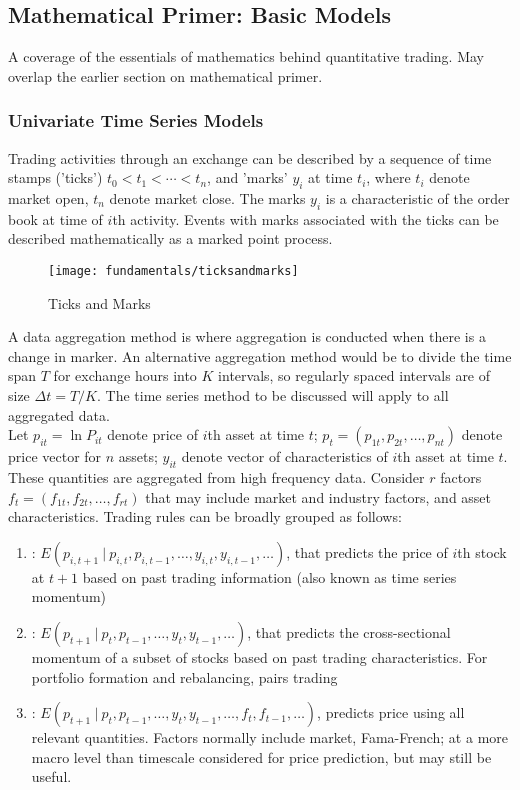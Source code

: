 \subsection{Mathematical Primer: Basic Models}

A coverage of the essentials of mathematics behind quantitative trading. May overlap the earlier section on mathematical primer.

\subsubsection{Univariate Time Series Models}

Trading activities through an exchange can be described by a sequence of time stamps ('ticks') $t_0 < t_1 < \cdots < t_n$, and 'marks' $y_i$ at time $t_i$, where $t_i$ denote market open, $t_n$ denote market close. The marks $y_i$ is a characteristic of the order book at time of $i$th activity. Events with marks associated with the ticks can be described mathematically as a marked point process.
\begin{figure}[H]
\centering
\texttt{[image: fundamentals/ticksandmarks]}
\caption{Ticks and Marks}
\end{figure}

A data aggregation method is where aggregation is conducted when there is a change in marker. An alternative aggregation method would be to divide the time span $T$ for exchange hours into $K$ intervals, so regularly spaced intervals are of size $\Delta t = T/K$. The time series method to be discussed will apply to all aggregated data.\\

Let $p_{it} = \ln P_{it}$ denote price of $i$th asset at time $t$; $p_t = (p_{1t}, p_{2t}, \ldots, p_{nt})$ denote price vector for $n$ assets; $y_{it}$ denote vector of characteristics of $i$th asset at time $t$. These quantities are aggregated from high frequency data. Consider $r$ factors $f_t = (f_{1t}, f_{2t}, \ldots, f_{rt})$ that may include market and industry factors, and asset characteristics. Trading rules can be broadly grouped as follows:
\begin{enumerate}[label=\roman*.]
\setlength{\itemsep}{0pt}
\item {}: $E(p_{i, t+1} \ \vert \ p_{i,t}, p_{i, t-1}, \ldots, y_{i,t}, y_{i, t-1}, \ldots)$, that predicts the price of $i$th stock at $t+1$ based on past trading information (also known as time series momentum)
\item {}: $E(p_{t+1} \ \vert \ p_t, p_{t-1}, \ldots, y_t, y_{t-1}, \ldots)$, that predicts the cross-sectional momentum of a subset of stocks based on past trading characteristics. For portfolio formation and rebalancing, pairs trading
\item {}: $E(p_{t+1} \ \vert \ p_{t}, p_{t-1}, \ldots, y_t, y_{t-1}, \ldots, f_t, f_{t-1}, \ldots)$, predicts price using all relevant quantities. Factors normally include market, Fama-French; at a more macro level than timescale considered for price prediction, but may still be useful.
\end{enumerate}

